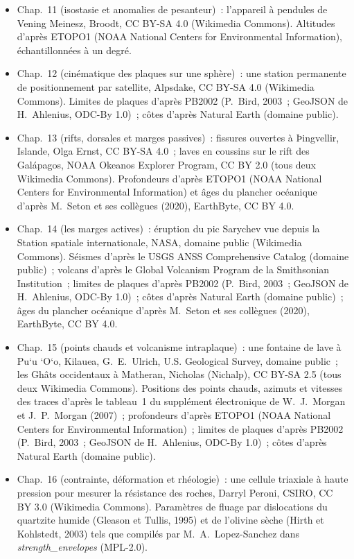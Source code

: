 \begin{itemize}
  \item Chap.~11 (isostasie et anomalies de pesanteur)~: l'appareil à pendules de Vening Meinesz, Broodt, CC BY-SA 4.0 (Wikimedia Commons). Altitudes d'après ETOPO1 (NOAA National Centers for Environmental Information), échantillonnées à un degré.
  \item Chap.~12 (cinématique des plaques sur une sphère)~: une station permanente de positionnement par satellite, Alpsdake, CC BY-SA 4.0 (Wikimedia Commons). Limites de plaques d'après PB2002 (P.~Bird, 2003~; GeoJSON de H.~Ahlenius, ODC-By 1.0)~; côtes d'après Natural Earth (domaine public).
  \item Chap.~13 (rifts, dorsales et marges passives)~: fissures ouvertes à Þingvellir, Islande, Olga Ernst, CC BY-SA 4.0~; laves en coussins sur le rift des Galápagos, NOAA Okeanos Explorer Program, CC BY 2.0 (tous deux Wikimedia Commons). Profondeurs d'après ETOPO1 (NOAA National Centers for Environmental Information) et âges du plancher océanique d'après M.~Seton et ses collègues (2020), EarthByte, CC BY 4.0.
  \item Chap.~14 (les marges actives)~: éruption du pic Sarychev vue depuis la Station spatiale internationale, NASA, domaine public (Wikimedia Commons). Séismes d'après le USGS ANSS Comprehensive Catalog (domaine public)~; volcans d'après le Global Volcanism Program de la Smithsonian Institution~; limites de plaques d'après PB2002 (P.~Bird, 2003~; GeoJSON de H.~Ahlenius, ODC-By 1.0)~; côtes d'après Natural Earth (domaine public)~; âges du plancher océanique d'après M.~Seton et ses collègues (2020), EarthByte, CC BY 4.0.
  \item Chap.~15 (points chauds et volcanisme intraplaque)~: une fontaine de lave à Pu\textquoteleft u \textquoteleft O\textquoteleft o, Kilauea, G.~E.~Ulrich, U.S. Geological Survey, domaine public~; les Ghâts occidentaux à Matheran, Nicholas (Nichalp), CC BY-SA 2.5 (tous deux Wikimedia Commons). Positions des points chauds, azimuts et vitesses des traces d'après le tableau~1 du supplément électronique de W.~J.~Morgan et J.~P.~Morgan (2007)~; profondeurs d'après ETOPO1 (NOAA National Centers for Environmental Information)~; limites de plaques d'après PB2002 (P.~Bird, 2003~; GeoJSON de H.~Ahlenius, ODC-By 1.0)~; côtes d'après Natural Earth (domaine public).
  \item Chap.~16 (contrainte, déformation et rhéologie)~: une cellule triaxiale à haute pression pour mesurer la résistance des roches, Darryl Peroni, CSIRO, CC BY 3.0 (Wikimedia Commons). Paramètres de fluage par dislocations du quartzite humide (Gleason et Tullis, 1995) et de l'olivine sèche (Hirth et Kohlstedt, 2003) tels que compilés par M.~A.~Lopez-Sanchez dans \emph{strength\_envelopes} (MPL-2.0).

\end{itemize}
